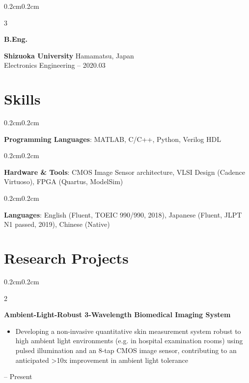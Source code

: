 \documentclass[10pt, letterpaper]{article}
\newenvironment{highlights}{
    \begin{itemize}[
        topsep=0.1cm,
        parsep=0.1cm,
        partopsep=0pt,
        itemsep=0.05cm,
        leftmargin=0.5cm
    ]
}{\end{itemize}}
\newenvironment{highlightsforbulletentries}{
    \begin{itemize}[
        topsep=0.1cm,
        parsep=0.1cm,
        partopsep=0pt,
        itemsep=0.05cm,
        leftmargin=0.4cm
    ]
}{\end{itemize}}
\newenvironment{onecolentry}{
    \begin{adjustwidth}{0.2cm}{0.2cm}
}{\end{adjustwidth}}
\newenvironment{twocolentry}[2][]{
    \onecolentry
    \def\secondColumn{#2}
    \setcolumnwidth{\fill, 3.2cm}
    \begin{paracol}{2}
}{\switchcolumn \raggedleft \secondColumn \end{paracol} \endonecolentry}
\newenvironment{threecolentry}[3][]{
    \onecolentry
    \def\thirdColumn{#3}
    \setcolumnwidth{1cm, \fill, 3.2cm}
    \begin{paracol}{3}
    {\raggedright #2} \switchcolumn
}{\switchcolumn \raggedleft \thirdColumn \end{paracol} \endonecolentry}
\begin{document}
    \begin{threecolentry}{\textbf{B.Eng.}}{2016.04 – 2020.03}
        \textbf{Shizuoka University} \textbar{}  Hamamatsu, Japan \\ Electronics Engineering
    \end{threecolentry}

    \section{Skills}
    \begin{onecolentry}
        \textbf{Programming Languages}: 
            MATLAB, C/C++,  Python, Verilog HDL
    \end{onecolentry}
    \begin{onecolentry}
        \textbf{Hardware \& Tools}: CMOS Image Sensor architecture, VLSI Design (Cadence Virtuoso), FPGA (Quartus, ModelSim)
    \end{onecolentry}
    \begin{onecolentry}
        \textbf{Languages}: English (Fluent, TOEIC 990/990, 2018), Japanese (Fluent, JLPT N1 passed, 2019), Chinese (Native)

    \end{onecolentry}



\section{Research Projects}
    \begin{twocolentry}{2024 – Present}
        \textbf{Ambient-Light-Robust 3-Wavelength Biomedical Imaging System}
        \begin{highlights}
            \item Developing a non-invasive quantitative skin measurement system robust to high ambient light environments (e.g. in hospital examination rooms) using pulsed illumination and an 8-tap CMOS image sensor, contributing to an anticipated >10x improvement in ambient light tolerance
        \end{highlights}
    \end{twocolentry}
\end{document}
